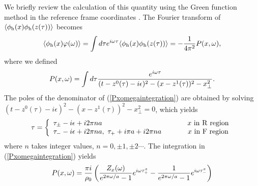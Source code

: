 \documentclass[aps,prd,preprintnumbers,nofootinbib,showpacs]{revtex4}%
\begin{document}
\begin{widetext}
We briefly review the calculation of this quantity using the Green function 
method in the reference frame coordinates 
 \cite{IYZ,IYZ2013}. 
The Fourier transform of $\langle\phi_{\rm h}(x)\phi_{\rm h}(z(\tau))\rangle$ becomes
\begin{eqnarray}
\langle\phi_{\rm h}(x)\varphi(\omega)\rangle
=\int d\tau e^{i\omega\tau}\langle\phi_{\rm h}(x)\phi_{\rm h}(z(\tau))\rangle =-{1\over4\pi^2} P(x,\omega),
\end{eqnarray}
where we defined 
\begin{eqnarray}
P(x,\omega)=\int d\tau {e^{i\omega\tau}\over (t-z^0(\tau)-i\epsilon)^2-(x-z^1(\tau))^2-x_\perp^2}.
\label{Pxomegaintegration}
\end{eqnarray}
The poles of the denominator of (\ref{Pxomegaintegration}) are obtained by solving
$(t-z^0(\tau)-i\epsilon)^2-(x-z^1(\tau))^2-x_\perp^2=0$, which yields
\begin{eqnarray}
\tau=
\left\{
\begin{array}{lc}
\displaystyle{
\tau_\pm-i\epsilon+i2\pi na}
~~~~&~~~~x{\rm ~in~R~region}
\\
\displaystyle{\tau_--i\epsilon+i2\pi na,~\tau_++i\pi a+i2\pi na}
~~~~&~~~~x{\rm ~in~F~region}
\end{array}
\right.
\end{eqnarray}
where $n$ takes integer values, $n=0,\pm1,\pm2\cdots$. 
The integration in (\ref{Pxomegaintegration}) yields
\begin{eqnarray}
P(x,\omega)=
\displaystyle{{\pi i\over \rho_0}\left({Z_x(\omega)\over e^{2\pi\omega/a}-1}e^{i\omega\tau_+^x}
-{1\over e^{2\pi\omega/a}-1}e^{i\omega\tau_-^x}\right)}

\end{eqnarray}
\end{widetext}
\end{document}
